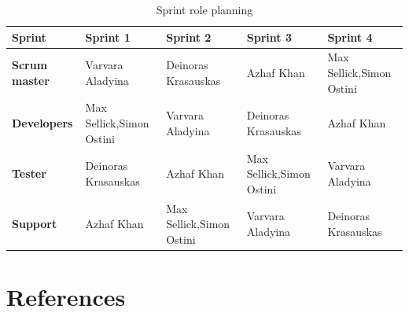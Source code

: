 \documentclass{article}
\begin{document}
\begin{table}[h]
  \centering
  \begin{tabularx}{\textwidth}{l|X|X|X|X}
    \toprule
    \textbf{Sprint}       & Sprint 1                          & Sprint 2                          & Sprint 3                          & Sprint 4                          \\
    \hline\hline
    \textbf{Scrum master} & Varvara Aladyina                  & Deinoras Krasauskas               & Azhaf Khan                        & Max Sellick,\newline Simon Ostini \\
    \hline
    \textbf{Developers}   & Max Sellick,\newline Simon Ostini & Varvara Aladyina                  & Deinoras Krasauskas               & Azhaf Khan                        \\
    \hline
    \textbf{Tester}       & Deinoras Krasauskas               & Azhaf Khan                        & Max Sellick,\newline Simon Ostini & Varvara Aladyina                  \\
    \hline
    \textbf{Support}      & Azhaf Khan                        & Max Sellick,\newline Simon Ostini & Varvara Aladyina                  & Deinoras Krasauskas               \\
    \bottomrule
  \end{tabularx}
  \caption{Sprint role planning}
  \label{Sprint role planning}
\end{table}

\clearpage

\section{References}
\printbibliography[heading=none]
\end{document}
